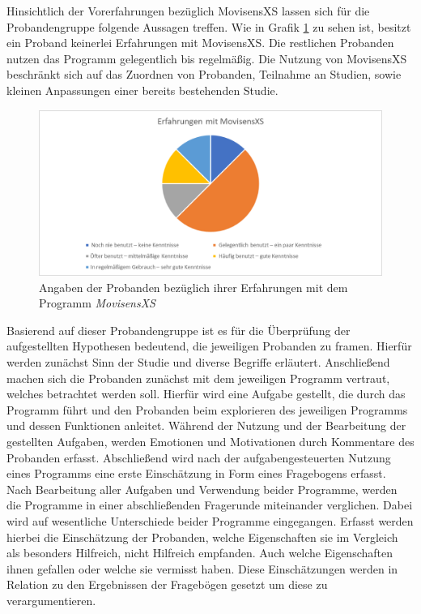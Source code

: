 Hinsichtlich der Vorerfahrungen bezüglich MovisensXS lassen sich für die Probandengruppe folgende Aussagen treffen. Wie in Grafik \ref{movisensXSErfahrung} zu sehen ist, besitzt ein Proband keinerlei Erfahrungen mit MovisensXS. Die restlichen Probanden nutzen das Programm gelegentlich bis regelmäßig. Die Nutzung von MovisensXS beschränkt sich auf das Zuordnen von Probanden, Teilnahme an Studien, sowie kleinen Anpassungen einer bereits bestehenden Studie. 

\begin{figure}[h]
\centering
\includegraphics[width=1\textwidth]{pictures/diagramme/movi}
\caption{Angaben der Probanden bezüglich ihrer Erfahrungen mit dem Programm \emph{MovisensXS}}
\label{movisensXSErfahrung}
\end{figure}

Basierend auf dieser Probandengruppe ist es für die Überprüfung der aufgestellten Hypothesen bedeutend, die jeweiligen Probanden zu framen. Hierfür werden zunächst Sinn der Studie und diverse Begriffe erläutert. Anschließend machen sich die Probanden zunächst mit dem jeweiligen Programm vertraut, welches betrachtet werden soll. Hierfür wird eine Aufgabe gestellt, die durch das Programm führt und den Probanden beim explorieren des jeweiligen Programms und dessen Funktionen anleitet. Während der Nutzung und der Bearbeitung der gestellten Aufgaben, werden Emotionen und Motivationen durch Kommentare des Probanden erfasst. Abschließend wird nach der aufgabengesteuerten Nutzung eines Programms eine erste Einschätzung in Form eines Fragebogens erfasst. Nach Bearbeitung aller Aufgaben und Verwendung beider Programme, werden die Programme in einer abschließenden Fragerunde miteinander verglichen. Dabei wird auf wesentliche Unterschiede beider Programme eingegangen. Erfasst werden hierbei die Einschätzung der Probanden, welche Eigenschaften sie im Vergleich als besonders Hilfreich, nicht Hilfreich empfanden. Auch welche Eigenschaften ihnen gefallen oder welche sie vermisst haben. Diese Einschätzungen werden in Relation zu den Ergebnissen der Fragebögen gesetzt um diese zu verargumentieren.



